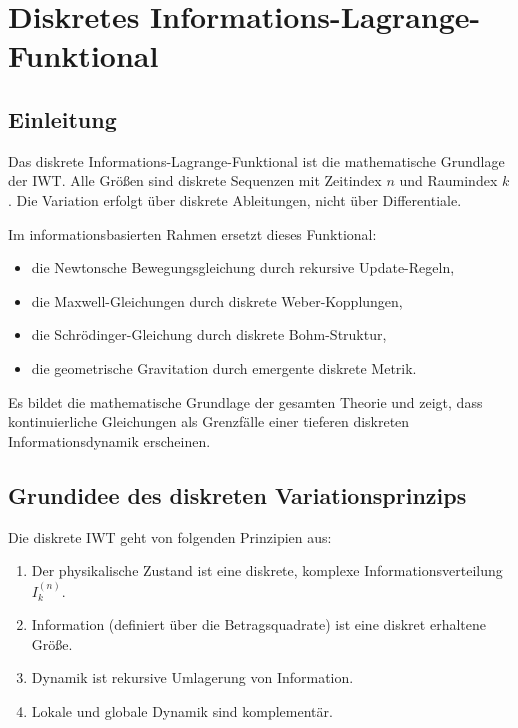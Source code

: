 
\chapter{Diskretes Informations-Lagrange-Funktional}
\label{ch:lagrange_funktional}

\section{Einleitung}
\label{sec:lagrange_einleitung}

Das diskrete Informations-Lagrange-Funktional ist die mathematische Grundlage der IWT. Alle Größen sind diskrete Sequenzen mit Zeitindex \( n \) und Raumindex \( k \). Die Variation erfolgt über diskrete Ableitungen, nicht über Differentiale.

Im informationsbasierten Rahmen ersetzt dieses Funktional:

\begin{itemize}
    \item die Newtonsche Bewegungsgleichung durch rekursive Update-Regeln,
    \item die Maxwell-Gleichungen durch diskrete Weber-Kopplungen,
    \item die Schrödinger-Gleichung durch diskrete Bohm-Struktur,
    \item die geometrische Gravitation durch emergente diskrete Metrik.
\end{itemize}

Es bildet die mathematische Grundlage der gesamten Theorie und zeigt, dass kontinuierliche Gleichungen als Grenzfälle einer tieferen diskreten Informationsdynamik erscheinen.

\section{Grundidee des diskreten Variationsprinzips}
\label{sec:varia_prinzip}

Die diskrete IWT geht von folgenden Prinzipien aus:

\begin{enumerate}
    \item Der physikalische Zustand ist eine diskrete, komplexe Informationsverteilung \( I_k^{(n)} \).
    \item Information (definiert über die Betragsquadrate) ist eine diskret erhaltene Größe.
    \item Dynamik ist rekursive Umlagerung von Information.
    \item Lokale und globale Dynamik sind komplementär.
\end{enumerate}

